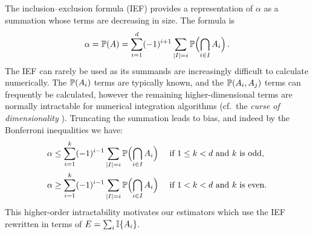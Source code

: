 The inclusion--exclusion formula (IEF) provides a representation of $\alpha$
as a summation whose terms are decreasing in size.
The formula is
\begin{equation} \label{incl_excl}
 \alpha = \operatorname{{\mathbb P}}(A)
  =\sum_{i=1}^d  (-1)^{i+1} \sum_{\lvert I\rvert= i}  \operatorname{{\mathbb P}}\Bigl(\bigcap_{i\in I}A_i\Bigr)  \,.
\end{equation}
The IEF can rarely be used as its summands are increasingly difficult to calculate numerically.
The $\operatorname{{\mathbb P}}(A_i)$ terms are typically known, and the $\operatorname{{\mathbb P}}(A_i,A_j)$ terms can frequently be calculated, however the remaining higher-dimensional terms are normally intractable for numerical integration algorithms (cf.\ the \emph{curse of dimensionality} \cite[Chapter IX]{asmussen2007stochastic}).
Truncating the summation leads to bias, and indeed by the Bonferroni inequalities we have:
\begin{align}
  \alpha &\le \sum_{i=1}^k  (-1)^{i-1} \sum_{\lvert I\rvert= i} \operatorname{{\mathbb P}}\Bigl(\bigcap_{i\in I}A_i\Bigr) \quad \text{ if } 1\le k < d \text{ and } k \text{ is odd}, \label{bonf_odd} \\
  \alpha &\ge \sum_{i=1}^k  (-1)^{i-1} \sum_{\lvert I\rvert= i} \operatorname{{\mathbb P}}\Bigl(\bigcap_{i\in I}A_i\Bigr) \quad \text{ if } 1<k<d \text{ and } k \text{ is even}. \label{bonf_even}
\end{align}
This higher-order intractability motivates our estimators which use the IEF rewritten in terms of $E = \sum_i \mathbb{I}\{  A_i  \}$.

